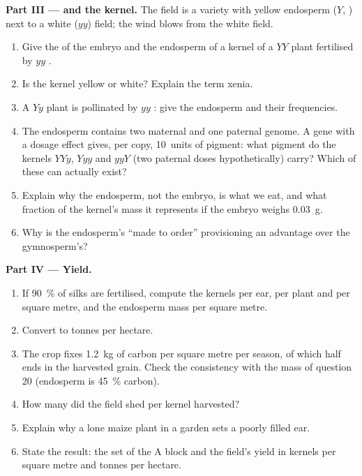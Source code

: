\begin{problem}
\medskip
\noindent\textbf{Part III ---  and the kernel.}
The field is a variety with yellow endosperm ($Y$, ) next to
a white ($yy$) field; the wind blows from the white field.
\begin{enumerate}[resume]
  \item Give the  of the embryo and the endosperm of a
        kernel of a $YY$ plant fertilised by $yy$ .
  \item Is the kernel yellow or white? Explain the term xenia.
  \item A $Yy$ plant is pollinated by $yy$ : give the endosperm
         and their frequencies.
  \item The endosperm contains two maternal and one paternal genome.
        A gene with a dosage effect gives, per copy, 10~units of
        pigment: what pigment do the kernels $YYy$, $Yyy$ and $yyY$
        (two paternal doses hypothetically) carry? Which of these
        can actually exist?
  \item Explain why the endosperm, not the embryo, is what we eat,
        and what fraction of the kernel's mass it represents if the
        embryo weighs \qty{0.03}{g}.
  \item Why is the endosperm's ``made to order'' provisioning an
        advantage over the gymnosperm's?
\end{enumerate}

\medskip
\noindent\textbf{Part IV --- Yield.}
\begin{enumerate}[resume]
  \item If \qty{90}{\%} of silks are fertilised, compute the kernels
        per ear, per plant and per square metre, and the endosperm
        mass per square metre.
  \item Convert to tonnes per hectare.
  \item The crop fixes \qty{1.2}{kg} of carbon per square metre per
        season, of which half ends in the harvested grain. Check the
        consistency with the mass of question 20 (endosperm is
        \qty{45}{\%} carbon).
  \item How many  did the field shed per kernel
        harvested?
  \item Explain why a lone maize plant in a garden sets a poorly
        filled ear.
  \item State the result: the  set of the A block and the
        field's yield in kernels per square metre and tonnes per
        hectare.
\end{enumerate}
\end{problem}
